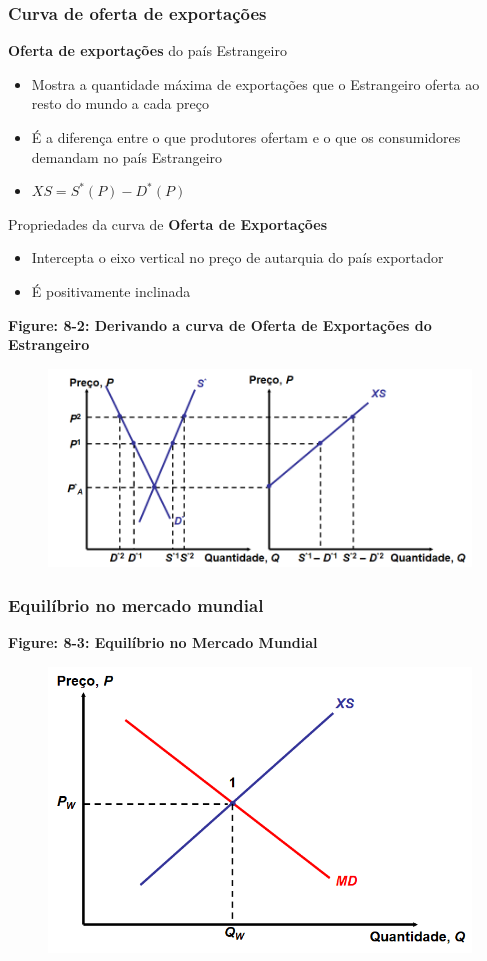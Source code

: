 \documentclass[a4paper,12pt]{article}[abntex2]
\begin{document}
\subsubsection{\textbf{Curva de oferta de exportações}}
\textbf{Oferta de exportações} do país Estrangeiro
\begin{itemize}
  \item Mostra a quantidade máxima de exportações que o Estrangeiro oferta ao resto do mundo a cada preço
  \item É a diferença entre o que produtores ofertam e o que os consumidores demandam no país Estrangeiro
  \item $XS = S^*(P) - D^*(P)$
\end{itemize}

Propriedades da curva de \textbf{Oferta de Exportações}
\begin{itemize}
  \item Intercepta o eixo vertical no preço de autarquia do país exportador
  \item É positivamente inclinada
\end{itemize}

\textbf{Figure: 8-2: Derivando a curva de Oferta de Exportações do Estrangeiro}
\begin{figure}[H]
    \centering
    \includegraphics[width=0.7\linewidth]{Imagens/a19i7.png}
\end{figure}

\subsubsection{\textbf{Equilíbrio no mercado mundial}}
\textbf{Figure: 8-3: Equilíbrio no Mercado Mundial}
\begin{figure}[H]
    \centering
    \includegraphics[width=0.7\linewidth]{Imagens/a19i8.png}
\end{figure}
\end{document}
